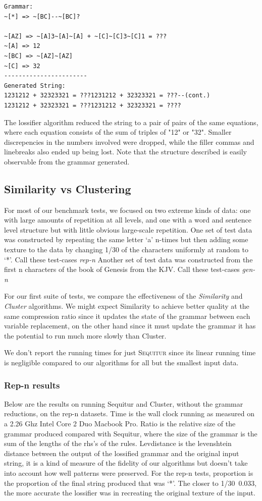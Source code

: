 \documentclass[11pt]{article}
\newcommand{\Sequitur}{\textsc{Sequitur}\xspace}
\begin{document}
\begin{verbatim}
Grammar:
~[*] => ~[BC]--~[BC]?

~[AZ] => ~[A]3~[A]~[A] + ~[C]~[C]3~[C]1 = ???
~[A] => 12
~[BC] => ~[AZ]~[AZ]
~[C] => 32
-----------------------
Generated String:
1231212 + 32323321 = ???1231212 + 32323321 = ???--(cont.)
1231212 + 32323321 = ???1231212 + 32323321 = ????
\end{verbatim}


The lossifier algorithm reduced the string to a pair of
pairs of the same equations, where each equation consists of the
sum of triples of "12" or "32". Smaller discrepencies
in the numbers involved were dropped, while the filler
commas and linebreaks also ended
up being lost. Note that the structure described is easily
observable from the grammar generated.

\subsection{Similarity vs Clustering}
For most of our benchmark tests, we focused on two extreme kinds of data:
one with large amounts of repetition at all levels, and one with a word
and sentence level structure but with little obvious large-scale repetition.
One set of test data was constructed by repeating the same letter `a' n-times
but then adding some
texture to the data by changing 1/30 of the characters uniformly
at random to `*'. Call these test-cases \emph{rep-n}
Another set of test data was constructed from the first n characters of the
book of Genesis from the KJV. Call these test-cases \emph{gen-n}

For our first suite of tests, we compare the effectiveness of the
\emph{Similarity} and \emph{Cluster} algorithms. We might expect
Similarity to achieve better quality at the same compression ratio
since it updates the state of the grammar between each variable
replacement, on the other hand since it must update the grammar
it has the potential to run much more slowly than Cluster.

We don't report the running times for just \Sequitur since its linear
running time is negligible compared to our algorithms for all but the
smallest input data.

\subsubsection{Rep-n results}

Below are the results on running Sequitur and Cluster, without
the grammar reductions, on the rep-n datasets. Time is the wall clock
running as measured on a 2.26 Ghz Intel Core 2 Duo Macbook Pro.
Ratio is the relative size of the grammar produced compared with
Sequitur, where the size of the grammar is the sum of the lengths of the
rhs's of the rules. Levdistance is the levenshtein distance between
the output of the lossified grammar and the original input string, it
is a kind of measure of the fidelity of our algorithms but doesn't
take into account how well patterns were preserved. For the rep-n tests,
proportion is the proportion of the final string produced that was
`*'. The closer to 1/30~0.033, the more accurate the lossifier was
in recreating the original texture of the input.
\end{document}
